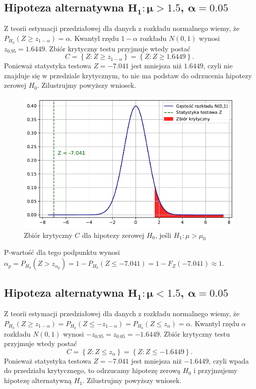 \documentclass[12pt]{mwart}
\begin{document}
	
	\subsection{Hipoteza alternatywna $\bm{H_1 \colon \mu > 1.5}$, $\bm{\alpha=0.05}$}
	\noindent Z teorii estymacji przedziałowej dla danych z rozkładu normalnego wiemy, że $P_{H_0}(Z\geq z_{1-\alpha})=\alpha$. Kwantyl rzędu $1-\alpha$ rozkładu $N(0,1)$ wynosi $z_{0.95}=1.6449$. Zbiór krytyczny testu przyjmuje wtedy postać 
	$$C = \left\lbrace Z: Z\geq z_{1-\alpha} \right\rbrace = \left\lbrace Z: Z\geq 1.6449 \right\rbrace .$$ 
	Ponieważ statystyka testowa $Z=-7.041$ jest mniejsza niż $1.6449$, czyli nie znajduje się w przedziale krytycznym, to nie ma podstaw do odrzucenia hipotezy zerowej $H_0$. Zilustrujmy powyższy wniosek.
	
	\begin{figure}[H]
	\begin{center}
		\includegraphics[scale=0.6]{krytyczny2.pdf}
		\caption{Zbiór krytyczny $C$ dla hipotezy zerowej $H_0$, jeśli $H_1 \colon \mu > \mu_0$}
	\end{center}
	\end{figure}
	
\noindent P-wartość dla tego podpunktu wynosi $\alpha_p = P_{H_0}(Z > z_{\alpha_p}) = 1 - P_{H_0}(Z \leq -7.041) = 1 - F_Z(-7.041) \approx 1 $.
	
	
	\subsection{Hipoteza alternatywna $\bm{H_1 \colon \mu < 1.5}$, $\bm{\alpha=0.05}$}
	\noindent Z teorii estymacji przedziałowej dla danych z rozkładu normalnego wiemy, że $P_{H_0}(Z\geq z_{1-\alpha}) = P_{H_0}(Z\leq -z_{1-\alpha})= P_{H_0}(Z\leq z_{\alpha}) = \alpha$. Kwantyl rzędu $\alpha$ rozkładu $N(0,1)$ wynosi $-z_{0.95}=z_{0.05}=-1.6449$. Zbiór krytyczny testu przyjmuje wtedy postać 
	$$C = \left\lbrace Z: Z\leq z_{\alpha} \right\rbrace = \left\lbrace Z: Z\leq -1.6449 \right\rbrace .$$ 
	Ponieważ statystyka testowa $Z=-7.041$ jest mniejsza niż $-1.6449$, czyli wpada do przedziału krytycznego, to odrzucamy hipotezę zerową $H_0$ i przyjmujemy hipotezę alternatywną $H_1$. Zilustrujmy powyższy wniosek.
	
\end{document}

